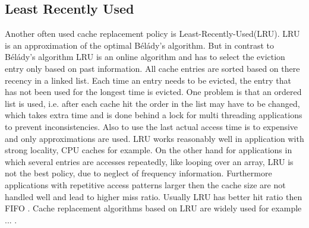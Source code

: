 \documentclass[
	12pt,
	a4paper,
	abstract,
	bibliography=totoc,
	chapterprefix,
	headings=openright,
	numbers=endperiod,
	parskip=half,
	twoside,
]{scrreprt}
\begin{document}

\subsection{Least Recently Used}
Another often used cache replacement policy is Least-Recently-Used(LRU).
LRU is an approximation of the optimal Bélády's algorithm.
But in contrast to Bélády's algorithm LRU is an online algorithm and has to select the eviction entry only based on past information.
All cache entries are sorted based on there recency in a linked list.
Each time an entry needs to be evicted, the entry that has not been used for the longest time is evicted.
One problem is that an ordered list is used, i.e. after each cache hit the order in the list may have to be changed, which takes extra time and is done behind a lock for multi threading applications to prevent inconsistencies.
Also to use the last actual access time is to expensive and only approximations are used.
LRU works reasonably well in application with strong locality, CPU caches for example.
On the other hand for applications in which several entries are accesses repeatedly, like looping over an array, LRU is not the best policy, due to neglect of frequency information.
Furthermore applications with repetitive access patterns larger then the cache size are not handled well and lead to higher miss ratio.
Usually LRU has better hit ratio then FIFO \cite{van1992lru}.
Cache replacement algorithms based on LRU are widely used for example ... .
\end{document}
